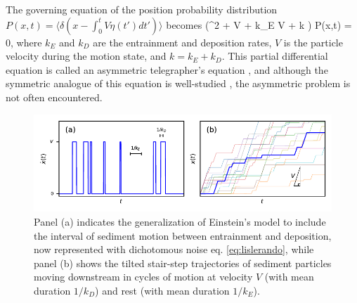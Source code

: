 The governing equation of the position probability distribution $P(x,t) = \langle \delta(x-\int_0^t V\eta(t')dt') \rangle$ becomes \citep{Balakrishnan1993}
\be \big(\pt^2 + V \px \pt + k_E V \px + k \pt \big) P(x,t) = 0,\label{eq:lislemaster}\ee
where $k_E$ and $k_D$ are the entrainment and deposition rates, $V$ is the particle velocity during the motion state, and $k = k_E+k_D$. This partial differential equation is called an asymmetric telegrapher's equation \citep{Rossetto2018}, and although the symmetric analogue of this equation is well-studied \citep{Weiss2002a, Masoliver2017}, the asymmetric problem is not often encountered.
\begin{figure}[!htbp]
	\includegraphics[width=\linewidth,keepaspectratio]{./figures/ch1/lisleConcept.pdf}
	\caption{Panel (a) indicates the generalization of Einstein's model to include the interval of sediment motion between entrainment and deposition, now represented with dichotomous noise eq. \ref{eq:lislerando}, while panel (b) shows the tilted stair-step trajectories of sediment particles moving downstream in cycles of motion at velocity $V$ (with mean duration $1/k_D$) and rest (with mean duration $1/k_E$). }
	\label{fig:lislefig}
\end{figure}

